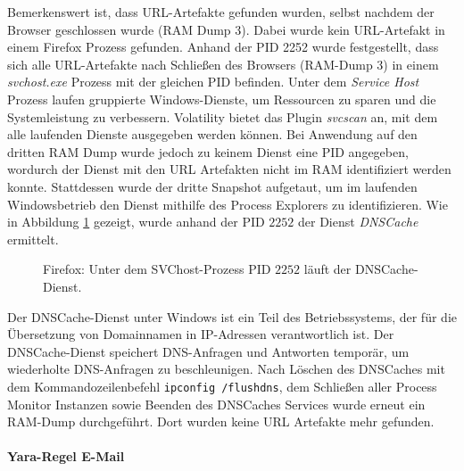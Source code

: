 Bemerkenswert ist, dass URL-Artefakte gefunden wurden, selbst nachdem der Browser geschlossen wurde (RAM Dump 3). Dabei wurde kein URL-Artefakt in einem Firefox Prozess gefunden.
Anhand der PID 2252 wurde festgestellt, dass sich alle URL-Artefakte nach Schließen des Browsers (RAM-Dump 3) in einem \textit{svchost.exe} Prozess mit der gleichen PID befinden. Unter dem \textit{Service Host} Prozess laufen gruppierte Windows-Dienste, um Ressourcen zu sparen und die Systemleistung zu verbessern.
Volatility bietet das Plugin \textit{svcscan} an, mit dem alle laufenden Dienste ausgegeben werden können.
Bei Anwendung auf den dritten RAM Dump wurde jedoch zu keinem Dienst eine PID angegeben, wordurch der Dienst mit den URL Artefakten nicht im RAM identifiziert werden konnte. \cite{Nicholasswhite.05.06.2023}
Stattdessen wurde der dritte Snapshot aufgetaut, um im laufenden Windowsbetrieb den Dienst mithilfe des Process Explorers zu identifizieren.
Wie in Abbildung \ref{chart:svchost-dnscache} gezeigt, wurde anhand der PID $2252$ der Dienst \textit{DNSCache} ermittelt.
\begin{figure}[h!]
	\centerline{}
	\caption{Firefox: Unter dem SVChost-Prozess PID $2252$ läuft der DNSCache-Dienst.}
	\label{chart:svchost-dnscache}  
\end{figure}
Der DNSCache-Dienst unter Windows ist ein Teil des Betriebssystems, der für die Übersetzung von Domainnamen in IP-Adressen verantwortlich ist. Der DNSCache-Dienst speichert DNS-Anfragen und Antworten temporär, um wiederholte DNS-Anfragen zu beschleunigen. \cite{MicrosoftLearn.05.06.2023}
Nach Löschen des DNSCaches mit dem Kommandozeilenbefehl \texttt{ipconfig /flushdns}, dem Schließen aller Process Monitor Instanzen sowie Beenden des DNSCaches Services wurde erneut ein RAM-Dump durchgeführt. Dort wurden keine URL Artefakte mehr gefunden.

\paragraph*{Yara-Regel \grqq{}E-Mail\grqq{}}

